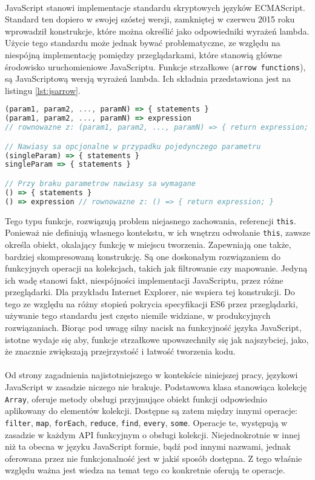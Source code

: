 \documentclass[a4paper,10pt]{report}
\begin{document}
\paragraph{}
JavaScript stanowi implementacje standardu skryptowych języków ECMAScript. Standard ten dopiero w swojej szóstej wersji, zamkniętej w czerwcu 2015 roku wprowadził konstrukcje, które można określić jako odpowiedniki wyrażeń lambda. Użycie tego standardu może jednak bywać problematyczne, ze względu na niespójną implementację pomiędzy przeglądarkami, które stanowią główne środowisko uruchomieniowe JavaScriptu. 
Funkcje strzałkowe (\verb|arrow functions|), są JavaScriptową wersją wyrażeń lambda. Ich składnia przedstawiona jest na listingu \ref{lst:jsarrow}.
\begin{lstlisting}[caption={Funkcje strzałkowe \cite{lambdajssyntax}},label={lst:jsarrow},language=Javascript]
(param1, param2, ..., paramN) => { statements }
(param1, param2, ..., paramN) => expression
// rownowazne z: (param1, param2, ..., paramN) => { return expression; }

// Nawiasy sa opcjonalne w przypadku pojedynczego parametru
(singleParam) => { statements }
singleParam => { statements }

// Przy braku parametrow nawiasy sa wymagane
() => { statements }
() => expression // rownowazne z: () => { return expression; }
\end{lstlisting}
Tego typu funkcje, rozwiązują problem niejasnego zachowania, referencji \verb|this|. Ponieważ nie definiują własnego kontekstu, w ich wnętrzu odwołanie \verb|this|, zawsze określa obiekt, okalający funkcję w miejscu tworzenia. Zapewniają one także, bardziej skompresowaną konstrukcję. Są one doskonałym rozwiązaniem do funkcyjnych operacji na kolekcjach, takich jak filtrowanie czy mapowanie. Jedyną ich wadę stanowi fakt, niespójności implementacji JavaScriptu, przez różne przeglądarki. Dla przykładu Internet Explorer, nie wspiera tej konstrukcji. Do tego ze względu na różny stopień pokrycia specyfikacji ES6 przez przeglądarki, używanie tego standardu jest często niemile widziane, w produkcyjnych rozwiązaniach. Biorąc pod uwagę silny nacisk na funkcyjność języka JavaScript, istotne wydaje się aby, funkcje strzałkowe upowszechniły się jak najszybciej, jako, że znacznie zwiększają przejrzystość i łatwość tworzenia kodu.
\paragraph{}
Od strony zagadnienia najistotniejszego w kontekście niniejszej pracy, językowi JavaScript w zasadzie niczego nie brakuje. Podstawowa klasa stanowiąca kolekcję \verb|Array|, oferuje metody obsługi przyjmujące obiekt funkcji odpowiednio aplikowany do elementów kolekcji. Dostępne są zatem między innymi operacje: \verb|filter|, \verb|map|, \verb|forEach|, \verb|reduce|, \verb|find|, \verb|every|, \verb|some|. Operacje te, występują w zasadzie w każdym API funkcyjnym o obsługi kolekcji. Niejednokrotnie w innej niż ta obecna w języku JavaScript formie, bądź pod innymi nazwami, jednak oferowana przez nie funkcjonalność jest w jakiś sposób dostępna. Z tego właśnie względu ważna jest wiedza na temat tego co konkretnie oferują te operacje.
\end{document}
